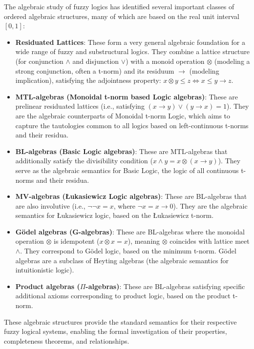 The algebraic study of fuzzy logics has identified several important classes of ordered algebraic structures, many of which are based on the real unit interval $[0,1]$:
\begin{itemize}
    \item \textbf{Residuated Lattices}: These form a very general algebraic foundation for a wide range of fuzzy and substructural logics. They combine a lattice structure (for conjunction $\wedge$ and disjunction $\vee$) with a monoid operation $\otimes$ (modeling a strong conjunction, often a t-norm) and its residuum $\rightarrow$ (modeling implication), satisfying the adjointness property: $x \otimes y \leq z \iff x \leq y \rightarrow z$.
    \item \textbf{MTL-algebras (Monoidal t-norm based Logic algebras)}: These are prelinear residuated lattices (i.e., satisfying $(x \rightarrow y) \vee (y \rightarrow x) = 1$). They are the algebraic counterparts of Monoidal t-norm Logic, which aims to capture the tautologies common to all logics based on left-continuous t-norms and their residua.
    \item \textbf{BL-algebras (Basic Logic algebras)}: These are MTL-algebras that additionally satisfy the divisibility condition ($x \wedge y = x \otimes (x \rightarrow y)$). They serve as the algebraic semantics for Basic Logic, the logic of all continuous t-norms and their residua.
    \item \textbf{MV-algebras (Łukasiewicz Logic algebras)}: These are BL-algebras that are also involutive (i.e., $\neg \neg x = x$, where $\neg x = x \rightarrow 0$). They are the algebraic semantics for Łukasiewicz logic, based on the Łukasiewicz t-norm.
    \item \textbf{Gödel algebras (G-algebras)}: These are BL-algebras where the monoidal operation $\otimes$ is idempotent ($x \otimes x = x$), meaning $\otimes$ coincides with lattice meet $\wedge$. They correspond to Gödel logic, based on the minimum t-norm. Gödel algebras are a subclass of Heyting algebras (the algebraic semantics for intuitionistic logic).
    \item \textbf{Product algebras ($\Pi$-algebras)}: These are BL-algebras satisfying specific additional axioms corresponding to product logic, based on the product t-norm.
\end{itemize}
These algebraic structures provide the standard semantics for their respective fuzzy logical systems, enabling the formal investigation of their properties, completeness theorems, and relationships.




